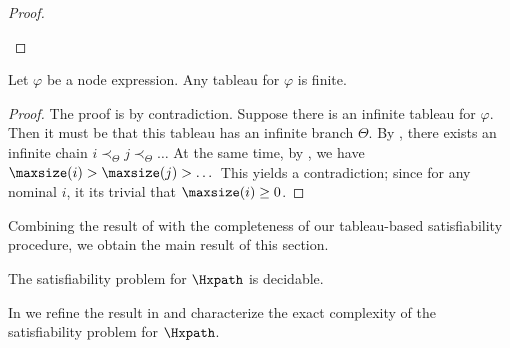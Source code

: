 \begin{proof}
\begin{description}

  \end{description}
\end{proof}

\begin{lem} \label{prop:termination}	
  Let $\varphi$ be a node expression.
  Any tableau for $\varphi$ is finite.
\end{lem}
\begin{proof}
  The proof is by contradiction. Suppose there is an infinite tableau for $\varphi$. Then it must be that this tableau has an infinite branch $\Theta$.
  By , there exists an infinite chain
  $
   i \prec_\Theta j \prec_\Theta \dots  
  $
  At the same time, by , we have 
  $
    \maxsize(i) > \maxsize(j) > \dots  
  $
  This yields a contradiction; since for any nominal $i$, it its trivial that $\maxsize(i) \geq 0$.
\end{proof}

Combining the result of  with the completeness of our tableau-based satisfiability procedure, we obtain the main result of this section.

\begin{thm}\label{th:decidability}
  The satisfiability problem for $\Hxpath$ is decidable.
\end{thm}

In  we refine the result in  and characterize the exact complexity of the satisfiability problem for $\Hxpath$. 